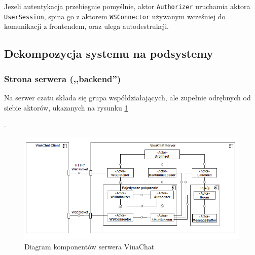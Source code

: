 Jezeli autentykacja przebiegnie pomyślnie, aktor \texttt{Authorizer} uruchamia
aktora \texttt{UserSession}, spina go z aktorem \texttt{WSConnector} używanym
wcześniej do komunikacji z frontendem, oraz ulega autodestrukcji.

\newpage

\subsection{Dekompozycja systemu na podsystemy}
\label{architektura_chatu}

\subsubsection{Strona serwera (,,backend'')}
Na serwer czatu składa się grupa współdziałających, ale zupełnie odrębnych od
siebie aktorów, ukazanych na rysunku \ref{diag-komp}

.
\begin{figure}[!htp]
	\centering
	\includegraphics[width=\textwidth]{chat/fig/pck-diag}
	\caption{Diagram komponentów serwera ViuaChat}
	\label{diag-komp}
\end{figure}

